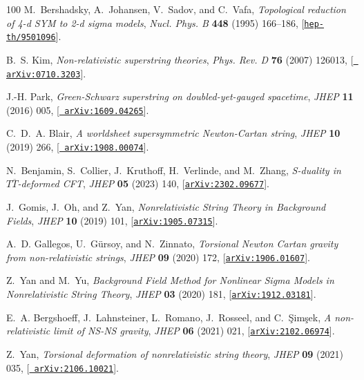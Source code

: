 \documentclass[11pt]{article}
\begin{document}
\begin{thebibliography}{100}
M.~Bershadsky, A.~Johansen, V.~Sadov, and C.~Vafa, {\it {Topological reduction
  of 4-d SYM to 2-d sigma models}},  {\em Nucl. Phys. B} {\bf 448} (1995)
  166--186, [\href{http://arxiv.org/abs/hep-th/9501096}{{\tt hep-th/9501096}}].

B.~S. Kim, {\it {Non-relativistic superstring theories}},  {\em Phys. Rev. D}
  {\bf 76} (2007) 126013, [\href{http://arxiv.org/abs/0710.3203}{{\tt
  arXiv:0710.3203}}].

J.-H. Park, {\it {Green-Schwarz superstring on doubled-yet-gauged spacetime}},
  {\em JHEP} {\bf 11} (2016) 005, [\href{http://arxiv.org/abs/1609.04265}{{\tt
  arXiv:1609.04265}}].

C.~D.~A. Blair, {\it {A worldsheet supersymmetric Newton-Cartan string}},  {\em
  JHEP} {\bf 10} (2019) 266, [\href{http://arxiv.org/abs/1908.00074}{{\tt
  arXiv:1908.00074}}].

N.~Benjamin, S.~Collier, J.~Kruthoff, H.~Verlinde, and M.~Zhang, {\it
  {S-duality in $ T\overline{T} $-deformed CFT}},  {\em JHEP} {\bf 05} (2023)
  140, [\href{http://arxiv.org/abs/2302.09677}{{\tt arXiv:2302.09677}}].

J.~Gomis, J.~Oh, and Z.~Yan, {\it {Nonrelativistic String Theory in Background
  Fields}},  {\em JHEP} {\bf 10} (2019) 101,
  [\href{http://arxiv.org/abs/1905.07315}{{\tt arXiv:1905.07315}}].

A.~D. Gallegos, U.~G\"ursoy, and N.~Zinnato, {\it {Torsional Newton Cartan
  gravity from non-relativistic strings}},  {\em JHEP} {\bf 09} (2020) 172,
  [\href{http://arxiv.org/abs/1906.01607}{{\tt arXiv:1906.01607}}].

Z.~Yan and M.~Yu, {\it {Background Field Method for Nonlinear Sigma Models in
  Nonrelativistic String Theory}},  {\em JHEP} {\bf 03} (2020) 181,
  [\href{http://arxiv.org/abs/1912.03181}{{\tt arXiv:1912.03181}}].

E.~A. Bergshoeff, J.~Lahnsteiner, L.~Romano, J.~Rosseel, and C.~\c{S}im\c{s}ek,
  {\it {A non-relativistic limit of NS-NS gravity}},  {\em JHEP} {\bf 06}
  (2021) 021, [\href{http://arxiv.org/abs/2102.06974}{{\tt arXiv:2102.06974}}].

Z.~Yan, {\it {Torsional deformation of nonrelativistic string theory}},  {\em
  JHEP} {\bf 09} (2021) 035, [\href{http://arxiv.org/abs/2106.10021}{{\tt
  arXiv:2106.10021}}].


\end{thebibliography}
\end{document}
